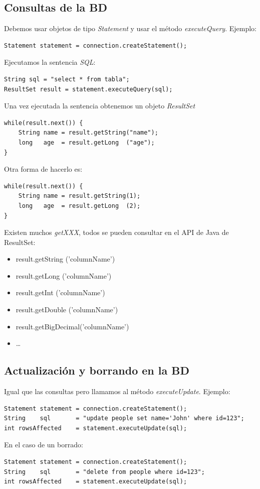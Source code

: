 \documentclass[4paper]{article}
\begin{document}
\subsection{Consultas de la BD}
Debemos usar objetos de tipo \emph{Statement} y usar el método \emph{executeQuery}. Ejemplo:
\begin{lstlisting}
Statement statement = connection.createStatement();
\end{lstlisting}
Ejecutamos la sentencia \emph{SQL}:
\begin{lstlisting}
String sql = "select * from tabla";
ResultSet result = statement.executeQuery(sql);
\end{lstlisting}
Una vez ejecutada la sentencia obtenemos un objeto \emph{ResultSet}
\begin{lstlisting}
while(result.next()) {
    String name = result.getString("name");
    long   age  = result.getLong  ("age");
}
\end{lstlisting}
Otra forma de hacerlo es:
\begin{lstlisting}
while(result.next()) {
    String name = result.getString(1);
    long   age  = result.getLong  (2);
}
\end{lstlisting}

Existen muchos \emph{getXXX}, todos se pueden consultar en el API de Java de ResultSet:
\begin{itemize}
\item result.getString    ('columnName')
\item result.getLong      ('columnName')
\item result.getInt       ('columnName')
\item result.getDouble    ('columnName')
\item result.getBigDecimal('columnName')
\item \dots
\end{itemize}

\subsection{Actualización y borrando en la BD}
Igual que las consultas pero llamamos al  método \emph{executeUpdate}. Ejemplo:
\begin{lstlisting}
Statement statement = connection.createStatement();
String    sql       = "update people set name='John' where id=123";
int rowsAffected    = statement.executeUpdate(sql);
\end{lstlisting}
En el caso de un borrado:
\begin{lstlisting}
Statement statement = connection.createStatement();
String    sql       = "delete from people where id=123";
int rowsAffected    = statement.executeUpdate(sql);
\end{lstlisting}
\end{document}
